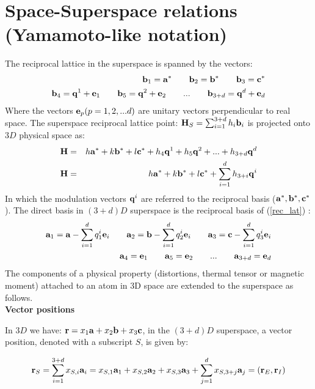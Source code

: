 \documentclass[10pt]{article}
\begin{document}
\section{Space-Superspace relations (Yamamoto-like notation)}

The reciprocal lattice in the superspace is spanned by the vectors:
\begin{eqnarray} \label{rec_lat}
{\bf b}_1={\bf a}^* \qquad {\bf b}_2={\bf b}^* \qquad {\bf b}_3={\bf c}^* \\
{\bf b}_4={\bf q}^1+{\bf e}_1 \qquad {\bf b}_5={\bf q}^2+{\bf e}_2 \qquad ...\qquad{\bf b}_{3+d}={\bf q}^d+{\bf e}_d
\end{eqnarray}
Where the vectors ${\bf e}_p (p=1,2,...d)$ are unitary vectors perpendicular to real space.
The superspace reciprocal lattice point: ${\bf H}_S= \sum_{i=1}^{3+d} h_i {\bf b}_i$ is projected onto $3D$ physical space as: 
\begin{eqnarray}
{\bf H} &=& h {\bf a}^* +k {\bf b}^* + l {\bf c}^* + h_4{\bf q}^1+ h_5{\bf q}^2 + ... + h_{3+d}{\bf q}^d \\
{\bf H} &=& h {\bf a}^* +k {\bf b}^* + l {\bf c}^*+\sum_{i=1}^{d} h_{3+i}{\bf q}^i
\end{eqnarray}
In which the modulation vectors ${\bf q}^i$ are referred to the reciprocal basis (${\bf a}^*,{\bf b}^*,{\bf c}^* $).
The direct basis in $(3+d)D$ superspace is the reciprocal basis of (\ref{rec_lat}) :
\begin{eqnarray}
{\bf a}_1={\bf a}-\sum_{i=1}^d q_1^i {\bf e}_i \qquad {\bf a}_2={\bf b}-\sum_{i=1}^d q_2^i {\bf e}_i \qquad {\bf a}_3={\bf c}-\sum_{i=1}^d q_3^i {\bf e}_i\\
{\bf a}_4= {\bf e}_1 \qquad {\bf a}_5={\bf e}_2 \qquad ...\qquad{\bf a}_{3+d}={\bf e}_d
\end{eqnarray}
The components of a physical property (distortions, thermal tensor or magnetic moment) attached to an atom in 3D space are extended to the superspace as follows.\\


{\bf  Vector positions }

In $3D$ we have: $ {\bf r}=x_1 {\bf a}+x_2 {\bf b} + x_3 {\bf c}$, in the $(3+d)D$ superspace, a vector position, denoted with a subscript $S$, is given by:
   
\begin{eqnarray} 
{\bf r}_S=\sum_{i=1}^{3+d} x_{S,i} {\bf a}_i=x_{S,1} {\bf a}_1+x_{S,2} {\bf a}_2 + x_{S,3} {\bf a}_3 + \sum_{j=1}^{d} x_{S,3+j} {\bf a}_j=({\bf r}_E,{\bf r}_I)
\end{eqnarray}
\end{document}
